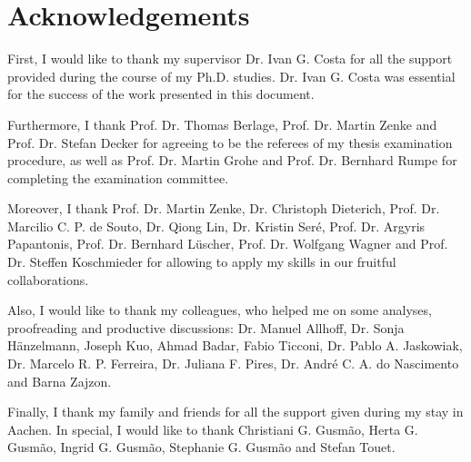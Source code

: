 \chapter*{Acknowledgements}

First, I would like to thank my supervisor Dr. Ivan G. Costa for all the support provided during the course of my Ph.D. studies. Dr. Ivan G. Costa was essential for the success of the work presented in this document.

Furthermore, I thank Prof. Dr. Thomas Berlage, Prof. Dr. Martin Zenke and Prof. Dr. Stefan Decker for agreeing to be the referees of my thesis examination procedure, as well as Prof. Dr. Martin Grohe and Prof. Dr. Bernhard Rumpe for completing the examination committee.

Moreover, I thank Prof. Dr. Martin Zenke, Dr. Christoph Dieterich, Prof. Dr. Marcilio C. P. de Souto, Dr. Qiong Lin, Dr. Kristin Ser\'{e}, Prof. Dr. Argyris Papantonis, Prof. Dr. Bernhard L\"uscher, Prof. Dr. Wolfgang Wagner and Prof. Dr. Steffen Koschmieder for allowing to apply my skills in our fruitful collaborations.

Also, I would like to thank my colleagues, who helped me on some analyses, proofreading and productive discussions: Dr. Manuel Allhoff, Dr. Sonja H\"anzelmann, Joseph Kuo, Ahmad Badar, Fabio Ticconi, Dr. Pablo A. Jaskowiak, Dr. Marcelo R. P. Ferreira, Dr. Juliana F. Pires, Dr. Andr\'{e} C. A. do Nascimento and Barna Zajzon.

Finally, I thank my family and friends for all the support given during my stay in Aachen. In special, I would like to thank Christiani G. Gusm\~{a}o, Herta G. Gusm\~{a}o, Ingrid G. Gusm\~{a}o, Stephanie G. Gusm\~{a}o and Stefan Touet.


